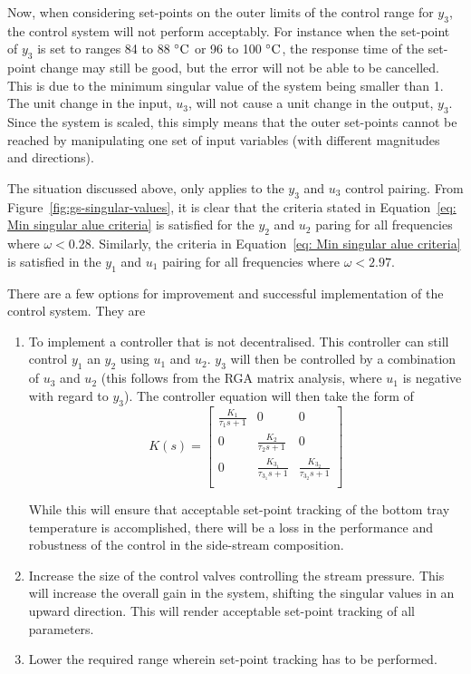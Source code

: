 Now, when considering set-points on the outer limits of the control range for $y_3$, the control system will not perform acceptably. For instance when the set-point of $y_3$ is set to ranges 84 to 88 $\celsius$ or 96 to 100 $\celsius$, the response time of the set-point change may still be good, but the error will not be able to be cancelled. This is due to the minimum singular value of the system being smaller than 1. The unit change in the input, $u_3$, will not cause a unit change in the output, $y_3$. Since the system is scaled, this simply means that the outer set-points cannot be reached by manipulating one set of input variables (with different magnitudes and directions). 

The situation discussed above, only applies to the $y_3$ and $u_3$ control pairing. From Figure~\ref{fig:gs-singular-values}, it is clear that the criteria stated in Equation~\ref{eq: Min singular alue criteria} is satisfied for the $y_2$ and $u_2$ paring for all frequencies where $\omega<0.28$. Similarly, the criteria in Equation~\ref{eq: Min singular alue criteria} is satisfied in the $y_1$ and $u_1$ pairing for all frequencies where $\omega < 2.97$.

There are a few options for improvement and successful implementation of the control system. They are

\begin{enumerate}
	\item To implement a controller that is not decentralised. This controller can still control $y_1$ an $y_2$ using $u_1$ and $u_2$. $y_3$ will then be controlled by a combination of $u_3$ and $u_2$ (this follows from the RGA matrix analysis, where $u_1$ is negative with regard to $y_3$). The controller equation will then take the form of
	\begin{equation}
		K(s) = \begin{bmatrix}
		\frac{K_1}{\tau_1s + 1} & 0 & 0\\
		0 &\frac{K_2}{\tau_2s + 1} & 0\\
		0 & \frac{K_{3_1}}{\tau_{3_1}s + 1} & \frac{K_{3_2}}{\tau_{3_2}s + 1}\\
		\end{bmatrix}
	\end{equation}
	
	While this will ensure that acceptable set-point tracking of the bottom tray temperature is accomplished, there will be a loss in the performance and robustness of the control in the side-stream composition.
	
	\item Increase the size of the control valves controlling the stream pressure. This will increase the overall gain in the system, shifting the singular values in an upward direction. This will render acceptable set-point tracking of all parameters.
	
	\item Lower the required range wherein set-point tracking has to be performed. 
\end{enumerate}

